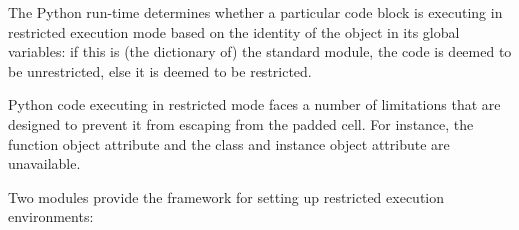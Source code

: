 The Python run-time determines whether a particular code block is
executing in restricted execution mode based on the identity of the
 object in its global variables: if this is (the
dictionary of) the standard  module, the code is
deemed to be unrestricted, else it is deemed to be restricted.

Python code executing in restricted mode faces a number of limitations
that are designed to prevent it from escaping from the padded cell.
For instance, the function object attribute  and the
class and instance object attribute  are unavailable.

Two modules provide the framework for setting up restricted execution
environments:

\localmoduletable

\begin{seealso}
\end{seealso}
